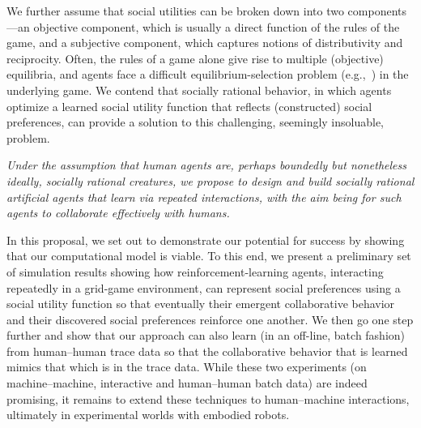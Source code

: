 We further assume that social utilities can be broken down into two
components---an objective component, which is usually a direct
function of the rules of the game, and a subjective component, which
captures notions of distributivity and reciprocity.
%
Often, the rules of a game alone give rise to multiple (objective)
equilibria, and agents face a difficult equilibrium-selection
problem (e.g.,~\cite{schelling1980strategy}) in the underlying game.
%
We contend that socially rational behavior, in which agents optimize a
learned social utility function that reflects (constructed) social
preferences, can provide a solution to this challenging, seemingly
insoluable, problem.


\emph{Under the assumption that human agents are, perhaps boundedly
  but nonetheless ideally, socially rational creatures, we propose to
  design and build socially rational artificial agents that learn
  via repeated interactions, with the aim being for such agents to
  collaborate effectively with humans.}

In this proposal, we set out to demonstrate our potential for success
by showing that our computational model is viable.  To this end,
we present a preliminary set of simulation results showing how
reinforcement-learning agents, interacting repeatedly in a grid-game
environment, can represent social preferences using a social utility
function so that eventually their emergent collaborative behavior and
their discovered social preferences reinforce one another.  We then go
one step further and show that our approach can also learn (in an
off-line, batch fashion) from human--human trace data so that the
collaborative behavior that is learned mimics that which is
in the trace data.  While these two experiments (on machine--machine,
interactive and human--human batch data) are indeed promising, it
remains to extend these techniques to human--machine interactions,
ultimately in experimental worlds with embodied robots.

